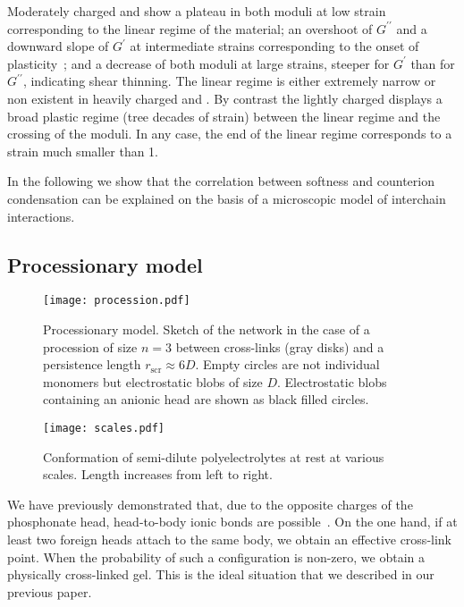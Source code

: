 \documentclass[twoside,twocolumn,9pt]{article}
\begin{document}
Moderately charged  and  show a plateau in both moduli at low strain corresponding to the linear regime of the material; an overshoot of $G^{\prime\prime}$ and a downward slope of $G^\prime$ at intermediate strains corresponding to the onset of plasticity~\cite{Hyun2011}; and a decrease of both moduli at large strains, steeper for $G^\prime$ than for $G^{\prime\prime}$, indicating shear thinning. The linear regime is either extremely narrow or non existent in heavily charged  and . By contrast the lightly charged  displays a broad plastic regime (tree decades of strain) between the linear regime and the crossing of the moduli. In any case, the end of the linear regime corresponds to a strain much smaller than 1.

In the following we show that the correlation between softness and counterion condensation can be explained on the basis of a microscopic model of interchain interactions.

\subsection{Processionary model}

\begin{figure}
\centering\texttt{[image: procession.pdf]}
\caption{Processionary model. Sketch of the network in the case of a procession of size $n=3$ between cross-links (gray disks) and a persistence length $r_\mathrm{scr}\approx 6D$. Empty circles are not individual monomers but electrostatic blobs of size $D$. Electrostatic blobs containing an anionic head are shown as black filled circles.}
\label{fig:procession}
\end{figure}
\begin{figure*}
\centering\texttt{[image: scales.pdf]}
\caption{Conformation of semi-dilute polyelectrolytes at rest at various scales. Length increases from left to right.}
\label{fig:scales}
\end{figure*}

We have previously demonstrated that, due to the opposite charges of the phosphonate head, head-to-body ionic bonds are possible~\cite{Srour2014}. On the one hand, if at least two foreign heads attach to the same body, we obtain an effective cross-link point. When the probability of such a configuration is non-zero, we obtain a physically cross-linked gel. This is the ideal situation that we described in our previous paper.
\end{document}
